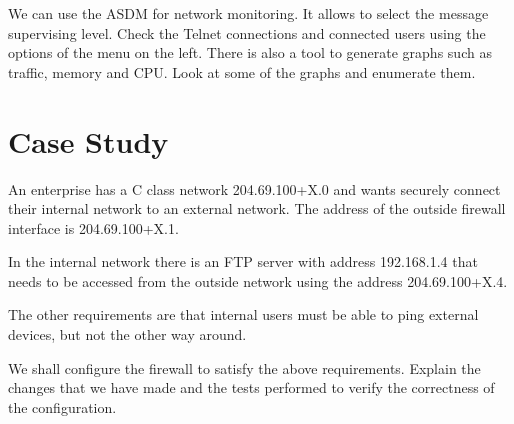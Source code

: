 We can use the ASDM for network monitoring. It allows to select the message supervising level. Check the Telnet connections and connected users using the options of the menu on the left. There is also a tool to generate graphs such as traffic, memory and CPU. Look at some of the graphs and enumerate them.

\section{Case Study}

An enterprise has a C class network 204.69.100+X.0 and wants securely connect their internal network to an external network. The address of the outside firewall interface is 204.69.100+X.1.

In the internal network there is an FTP server with address 192.168.1.4 that needs to be accessed from the outside network using the address 204.69.100+X.4.

The other requirements are that internal users must be able to ping external devices, but not the other way around.

We shall configure the firewall to satisfy the above requirements. Explain the changes that we have made and the tests performed to verify the correctness of the configuration.
